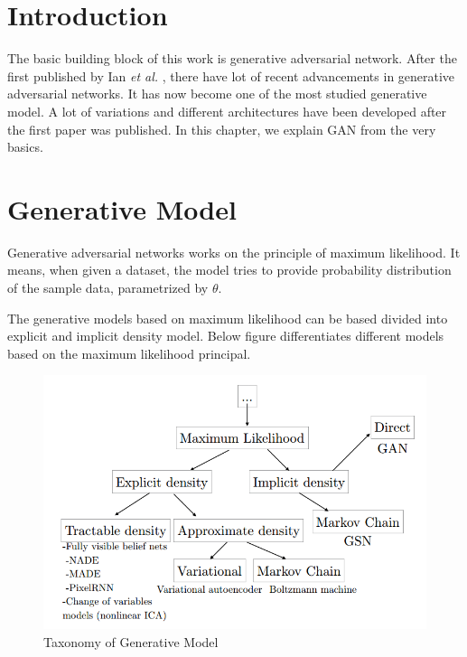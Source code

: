

\section{Introduction}

The basic building block of this work is generative adversarial network. After the first published by Ian \textit{et al.} \cite{Original-GAN} , there have lot of recent advancements in generative adversarial networks. It has now become one of the most studied generative model. A lot of variations and different architectures have been developed after the first paper was published. In this chapter, we explain GAN from the very basics.

\section{Generative Model}
Generative adversarial networks works on the principle of maximum likelihood.
It means, when given a dataset, the model tries to provide probability distribution of the sample data, parametrized by $\theta$. %
\par
The generative models based on maximum likelihood can be based divided into explicit and implicit density model. Below figure differentiates different models based on the maximum likelihood principal.
%
\begin{figure}[h]
    
    \includegraphics[scale=.6, angle=0]{Files/taxanomy.png}
    \caption[The panther]{Taxonomy of Generative Model\cite{GanTut}}
    \label{fig: jordan}
\end{figure}


